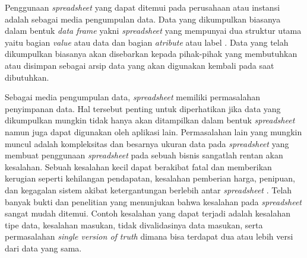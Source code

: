 Penggunaan \textit{spreadsheet} yang dapat ditemui pada perusahaan atau instansi adalah sebagai media pengumpulan data. Data yang dikumpulkan biasanya dalam bentuk \textit{data frame} yakni \textit{spreadsheet} yang mempunyai dua struktur utama yaitu bagian \textit{value} atau data dan bagian \textit{atribute} atau label \citep{Chen2013}. Data yang telah dikumpulkan biasanya akan disebarkan kepada pihak-pihak yang membutuhkan atau disimpan sebagai arsip data yang akan digunakan kembali pada saat dibutuhkan.

Sebagai media pengumpulan data, \textit{spreadsheet} memiliki permasalahan penyimpanan data. Hal tersebut penting untuk diperhatikan jika data yang dikumpulkan mungkin tidak hanya akan ditampilkan dalam bentuk \textit{spreadsheet} namun juga dapat digunakan oleh aplikasi lain. Permasalahan lain yang mungkin muncul adalah kompleksitas dan besarnya ukuran data pada \textit{spreadsheet} yang membuat penggunaan \textit{spreadsheet} pada sebuah bisnis sangatlah rentan akan kesalahan. Sebuah kesalahan kecil dapat berakibat fatal dan memberikan kerugian seperti kehilangan pendapatan, kesalahan pemberian harga, penipuan, dan kegagalan sistem akibat ketergantungan berlebih antar \textit{spreadsheet} \citep{EUSPRIGAbout}. Telah banyak bukti dan penelitian yang menunjukan bahwa kesalahan pada \textit{spreadsheet} sangat mudah ditemui. %
Contoh kesalahan yang dapat terjadi adalah kesalahan tipe data, kesalahan masukan, tidak divalidasinya data masukan, serta permasalahan \textit{single version of truth} dimana bisa terdapat dua atau lebih versi dari data yang sama.


